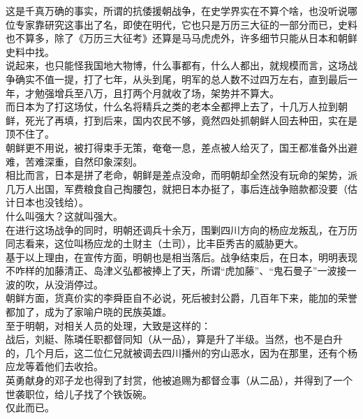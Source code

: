 \begin{multicols}{\theparacolNo}
这是千真万确的事实，所谓的抗倭援朝战争，在史学界实在不算个啥，也没听说哪位专家靠研究这事出了名，即使在明代，它也只是万历三大征的一部分而已，史料也不算多，除了《万历三大征考》还算是马马虎虎外，许多细节只能从日本和朝鲜史料中找。\\

说起来，也只能怪我国地大物博，什么事都有，什么人都出，就规模而言，这场战争确实不值一提，打了七年，从头到尾，明军的总人数不过四万左右，直到最后一年，才勉强增兵至八万，且打两个月就收了场，架势并不算大。\\

而日本为了打这场仗，什么名将精兵之类的老本全都押上去了，十几万人拉到朝鲜，死光了再填，打到后来，国内农民不够，竟然四处抓朝鲜人回去种田，实在是顶不住了。\\

朝鲜更不用说，被打得束手无策，奄奄一息，差点被人给灭了，国王都准备外出避难，苦难深重，自然印象深刻。\\

相比而言，日本是拼了老命，朝鲜是差点没命，而明朝却全然没有玩命的架势，派几万人出国，军费粮食自己掏腰包，就把日本办挺了，事后连战争赔款都没要（估计日本也没钱给）。\\

什么叫强大？这就叫强大。\\

在进行这场战争的同时，明朝还调兵十余万，围剿四川方向的杨应龙叛乱，在万历同志看来，这位叫杨应龙的土财主（土司），比丰臣秀吉的威胁更大。\\

基于以上理由，在宣传方面，明朝也是相当落后。战争结束后，在日本，明明表现不咋样的加藤清正、岛津义弘都被捧上了天，所谓“虎加藤”、“鬼石曼子”一波接一波的吹，从没消停过。\\

朝鲜方面，货真价实的李舜臣自不必说，死后被封公爵，几百年下来，能加的荣誉都加了，成为了家喻户晓的民族英雄。\\

至于明朝，对相关人员的处理，大致是这样的：\\

战后，刘綎、陈璘任职都督同知（从一品），算是升了半级。当然，也不是白升的，几个月后，这二位仁兄就被调去四川播州的穷山恶水，因为在那里，还有个杨应龙等着他们去收拾。\\

英勇献身的邓子龙也得到了封赏，他被追赐为都督佥事（从二品），并得到了一个世袭职位，给儿子找了个铁饭碗。\\

仅此而已。\\


\end{multicols}
